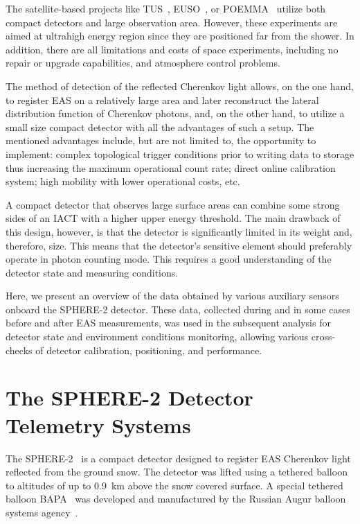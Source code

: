 \documentclass[universe,article,accept,moreauthors,pdftex]{Definitions/mdpi}
\begin{document}
The satellite-based projects like TUS~\cite{TUS2017, TUS2020}, EUSO~\cite{EUSO2015, EUSO2021}, or  POEMMA~\cite{POEMMA2021} utilize both compact detectors and large observation area. However, these experiments are aimed at ultrahigh energy region since they are positioned far from the shower. In addition, there are all limitations and costs of space experiments, including no repair or upgrade capabilities, and atmosphere control problems.

The method of detection of the reflected Cherenkov light allows, on {the} one hand, to register EAS on a relatively large area and later reconstruct the lateral distribution function of Cherenkov photons, and, on the other hand, to utilize a small size compact detector with all the advantages of such a setup. The mentioned advantages include, but are not limited to, the opportunity to implement: complex topological trigger conditions prior to writing data to storage thus increasing the maximum operational count rate; direct online calibration system; high mobility with lower operational costs, etc.

A compact detector that observes large surface areas can combine some strong sides of an IACT with a higher upper energy threshold. The main drawback of this design, however, is that the detector is significantly limited in its weight and, therefore, size. This means that the detector's sensitive element should preferably operate in photon counting mode. This requires a good understanding of the detector state and measuring conditions.

Here, we present an overview of the data obtained by various auxiliary sensors onboard the SPHERE-2 detector. These data, collected during and in some cases before and after EAS measurements, was used in the subsequent analysis for detector state and environment conditions monitoring, allowing various cross-checks of detector calibration, positioning, and performance.




\section{The SPHERE-2 Detector Telemetry Systems}
\label{sect:detector}

The \mbox{SPHERE-2}~\cite{Ant20} is a compact detector designed to register EAS Cherenkov light reflected from the ground snow. The detector was lifted using a tethered balloon to altitudes of up to 0.9~km above the snow covered surface. A special tethered balloon BAPA~\cite{Ant20} was developed and manufactured by the Russian Augur balloon systems agency~\cite{Augur}.
\end{document}
